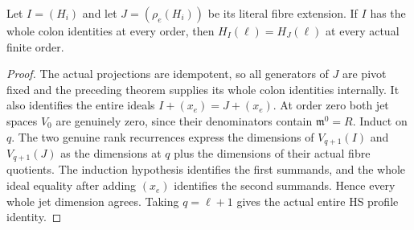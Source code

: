 \begin{theorem}
\label{hir:actual-exceptional-regular-symbol-fibre-hs-profile}
\leanok
Let $I=(H_i)$ and let $J=(\rho_e(H_i))$ be its literal fibre extension.
If $I$ has the whole colon identities at every order, then
$H_I(\ell)=H_J(\ell)$ at every actual finite order.
\end{theorem}
\begin{proof}
The actual projections are idempotent, so all generators of $J$ are
pivot fixed and the preceding theorem supplies its whole colon
identities internally. It also identifies the entire ideals
$I+(x_e)=J+(x_e)$. At order zero both jet spaces $V_0$ are genuinely
zero, since their denominators contain $\mathfrak m^0=R$.
Induct on $q$. The two genuine rank recurrences express the dimensions
of $V_{q+1}(I)$ and $V_{q+1}(J)$ as the dimensions at $q$ plus the
dimensions of their actual fibre quotients. The induction hypothesis
identifies the first summands, and the whole ideal equality after
adding $(x_e)$ identifies the second summands. Hence every whole jet
dimension agrees. Taking $q=\ell+1$ gives the actual entire HS profile
identity.
\end{proof}

